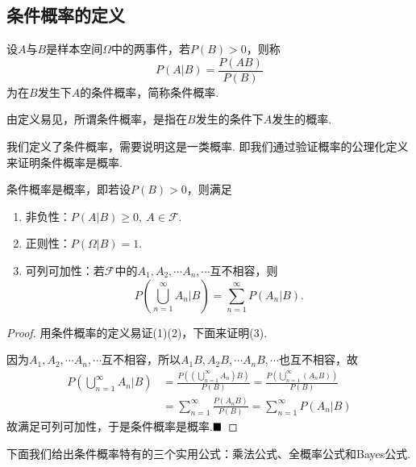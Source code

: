\subsection{条件概率的定义}
\begin{definition}[条件概率]
	设$A$与$B$是样本空间$\varOmega$中的两事件，若$P(B)>0$，则称
	$$P(A|B)=\frac{P(AB)}{P(B)}$$
	为在$B$发生下$A$的条件概率，简称{\heiti 条件概率}.
\end{definition}
\begin{remark}
	由定义易见，所谓条件概率，是指在$B$发生的条件下$A$发生的概率.
\end{remark}
我们定义了条件概率，需要说明这是一类概率. 即我们通过验证概率的公理化定义来证明条件概率是概率.
\begin{theorem}
	条件概率是概率，即若设$P(B)>0$，则满足
	\begin{enumerate}[(1)]
		\item 非负性：$P(A|B)\geqslant 0,\ A\in\mathscr{F}$.
		\item 正则性：$P(\varOmega|B)=1$.
		\item 可列可加性：若$\mathscr{F}$中的$A_1,A_2,\cdots A_n,\cdots$互不相容，则
		$$P\left(\bigcup_{n=1}^{\infty}A_n|B\right)=\sum_{n=1}^{\infty}P(A_n|B).$$
	\end{enumerate}
\end{theorem}
\begin{proof}
	用条件概率的定义易证(1)(2)，下面来证明(3).
	
	因为$A_1,A_2,\cdots A_n,\cdots$互不相容，所以$A_1B,A_2B,\cdots A_nB,\cdots$也互不相容，故
	\begin{align*}
		P\left(\bigcup_{n=1}^{\infty}A_n|B\right)
		&=\frac{P\left(\left(\displaystyle\bigcup_{n=1}^{\infty}A_n\right)B\right)}{P(B)}=\frac{P\left(\displaystyle\bigcup_{n=1}^{\infty}(A_nB)\right)}{P(B)}\\
		&=\sum_{n=1}^{\infty}\frac{P(A_nB)}{P(B)}=\sum_{n=1}^{\infty}P(A_n|B)
	\end{align*}
	故满足可列可加性，于是条件概率是概率.$\hfill\blacksquare$
\end{proof}
下面我们给出条件概率特有的三个实用公式：乘法公式、全概率公式和Bayes公式.
